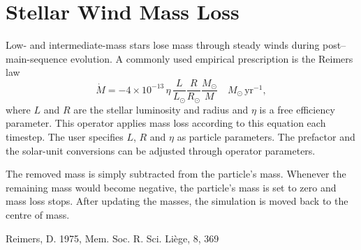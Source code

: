\section{Stellar Wind Mass Loss}
\label{sec:stellar_wind}

Low- and intermediate-mass stars lose mass through steady winds during
post--main-sequence evolution.  A commonly used empirical
prescription is the Reimers law\cite{Reimers1975}
\begin{equation}
  \dot M = -4\times10^{-13}\,\eta\,\frac{L}{L_\odot}\frac{R}{R_\odot}\frac{M_\odot}{M}\quad M_\odot\,\mathrm{yr}^{-1},
\end{equation}
where $L$ and $R$ are the stellar luminosity and radius and $\eta$ is a
free efficiency parameter.  This operator applies mass loss according
to this equation each timestep.  The user specifies $L$, $R$ and
$\eta$ as particle parameters.  The prefactor and the solar-unit
conversions can be adjusted through operator parameters.

The removed mass is simply subtracted from the particle's mass.
Whenever the remaining mass would become negative, the particle's mass
is set to zero and mass loss stops.  After updating the masses, the
simulation is moved back to the centre of mass.


\begin{thebibliography}{99}
 Reimers, D. 1975, Mem. Soc. R. Sci. Li\`ege, 8, 369
\end{thebibliography}
